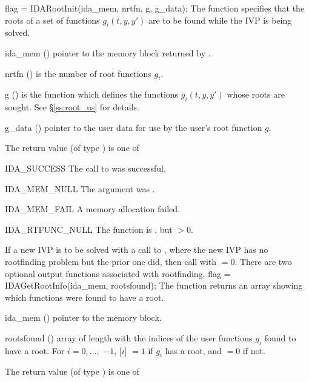 {
{
  flag = IDARootInit(ida\_mem, nrtfn, g, g\_data);
}
{
  The function  specifies that the roots of a set of
  functions $g_i(t,y,y')$ are to be found while the IVP is being solved.
}
{
  \begin{args}
  \item[ida\_mem] ()
    pointer to the {\ida} memory block returned by .
  \item[nrtfn] ()
    is the number of root functions $g_i$.
  \item[g] ()
    is the {\C} function which defines the  functions $g_i(t,y,y')$
    whose roots are sought. See \S\ref{ss:root_us} for details.
  \item[g\_data] ()
    pointer to the user data for use by the user's root function $g$.
 \end{args}
}
{
  The return value  (of type ) is one of
  \begin{args}
  \item[IDA\_SUCCESS]
    The call to  was successful.
  \item[IDA\_MEM\_NULL]
    The  argument was .
  \item[IDA\_MEM\_FAIL]
    A memory allocation failed.
  \item[IDA\_RTFUNC\_NULL]
    The function  is , but $>0$.
  \end{args}
}
{
  If a new IVP is to be solved with a call to , where the new
  IVP has no rootfinding problem but the prior one did, then call
   with $=0$.
}
There are two optional output functions associated with rootfinding.
{
  flag = IDAGetRootInfo(ida\_mem, rootsfound);
}
{
  The function  returns an array showing which 
  functions were found to have a root.
}
{
  \begin{args}
  \item[ida\_mem] ()
    pointer to the {\ida} memory block.
  \item[rootsfound] ()
    array of length  with the indices of the user functions $g_i$ found
    to have a root.  For $i = 0,\ldots, $ $-1$,
   [$i$] $ = 1$ if $g_i$ has a root, and $ = 0$ if not.
  \end{args}
}
{
  The return value  (of type ) is one of
}}
